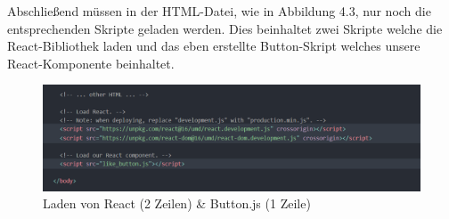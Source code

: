 Abschließend müssen in der HTML-Datei, wie in Abbildung 4.3,  nur noch die entsprechenden Skripte geladen werden. Dies beinhaltet zwei Skripte welche die React-Bibliothek laden und das eben erstellte Button-Skript welches unsere React-Komponente beinhaltet.
\begin{figure}[thb]
     \centerline{\includegraphics[width=14cm]{../Abbildungen/scriptLines.png}}
  \caption{Laden von React (2 Zeilen) \& Button.js (1 Zeile)}
  \label{fig1_1}
\end{figure}\\

